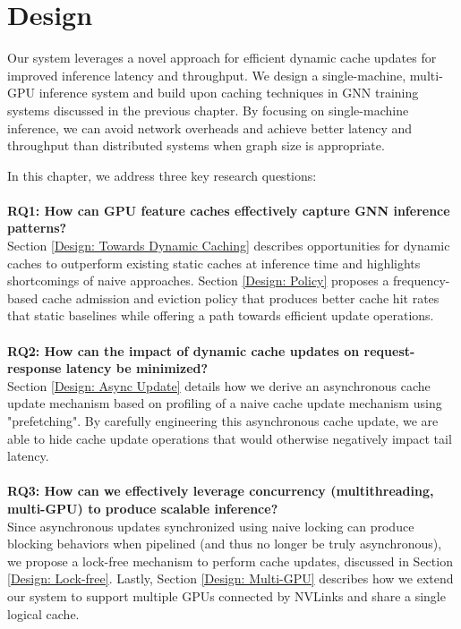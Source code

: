 \chapter{Design} \label{Design}
Our system leverages a novel approach for efficient dynamic cache updates for improved inference latency and throughput.
We design a single-machine, multi-GPU inference system and build upon caching techniques in GNN training systems discussed in the previous chapter. 
By focusing on single-machine inference, we can avoid network overheads and achieve better latency and throughput than distributed systems when graph size is appropriate.

In this chapter, we address three key research questions:
\\ \\
\noindent \textbf{RQ1: How can GPU feature caches effectively capture GNN inference patterns?} \\
Section \ref{Design: Towards Dynamic Caching} describes opportunities for dynamic caches to outperform existing static caches at inference time and highlights shortcomings of naive approaches. Section \ref{Design: Policy} proposes a frequency-based cache admission and eviction policy that produces better cache hit rates that static baselines while offering a path towards efficient update operations.
\\ \\
\noindent \textbf{RQ2: How can the impact of dynamic cache updates on request-response latency be minimized?} \\
Section \ref{Design: Async Update} details how we derive an asynchronous cache update mechanism based on profiling of a naive cache update mechanism using "prefetching". By carefully engineering this asynchronous cache update, we are able to hide cache update operations that would otherwise negatively impact tail latency.
\\ \\
\noindent \textbf{RQ3: How can we effectively leverage concurrency (multithreading, multi-GPU) to produce scalable inference?} \\
Since asynchronous updates synchronized using naive locking can produce blocking behaviors when pipelined (and thus no longer be truly asynchronous), we propose a lock-free mechanism to perform cache updates, discussed in Section \ref{Design: Lock-free}.
Lastly, Section \ref{Design: Multi-GPU} describes how we extend our system to support multiple GPUs connected by NVLinks and share a single logical cache.

